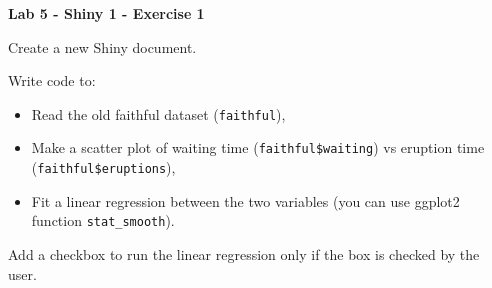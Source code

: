 \documentclass[letterpaper, 12pt]{article}
\begin{document}
\begin{center}
\textbf{\Large{Lab 5 - Shiny 1 - Exercise 1}}
\end{center}

\vspace{2em}

Create a new Shiny document.

\vspace{1em}

Write code to:
\begin{itemize}
	\item Read the old faithful dataset (\verb|faithful|),
	\item Make a scatter plot of waiting time (\verb|faithful$waiting|) vs eruption time (\verb|faithful$eruptions|),
	\item Fit a linear regression between the two variables (you can use ggplot2 function \verb|stat_smooth|).
\end{itemize}

\vspace{1em}

Add a checkbox to run the linear regression only if the box is checked by the user.
 
\end{document}
